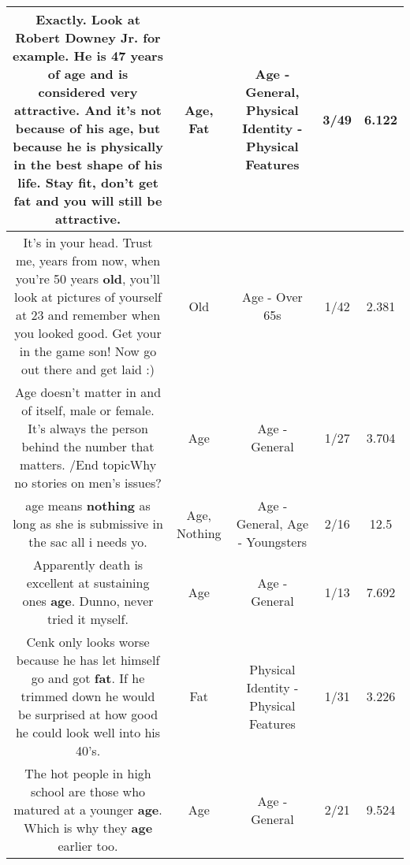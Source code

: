 \documentclass[11pt]{article}
\newlength\mylength
\begin{document}
\begin{center}
\begin{longtable}{|C{.65\mylength}|C{.30\mylength}|C{.12\mylength}|C{.12\mylength}|C{.12\mylength}|}
  \small Exactly. Look at Robert Downey Jr. for example. He is 47 years of \textbf{age} and is considered very attractive. And it's not because of his \textbf{age}, but because he is physically in the best shape of his life. Stay fit, don't get \textbf{fat} and you will still be attractive.\normalsize   & Age, Fat & Age - General, Physical Identity - Physical Features & 3/49 & 6.122 \\  \hline
  \small It's in your head. Trust me, years from now, when you're 50 years \textbf{old}, you'll look at pictures of yourself at 23 and remember when you looked good. Get your in the game son! Now go out there and get laid :)\normalsize   & Old & Age - Over 65s & 1/42 & 2.381 \\  \hline
  \small Age doesn't matter in and of itself, male or female. It's always the person behind the number that matters. /End topicWhy no stories on men's issues?\normalsize   & Age & Age - General & 1/27 & 3.704 \\  \hline
  \small age means \textbf{nothing} as long as she is submissive in the sac all i needs yo.\normalsize   & Age, Nothing & Age - General, Age - Youngsters & 2/16 & 12.5 \\  \hline
  \small Apparently death is excellent at sustaining ones \textbf{age}. Dunno, never tried it myself.\normalsize   & Age & Age - General & 1/13 & 7.692 \\  \hline
  \small Cenk only looks worse because he has let himself go and got \textbf{fat}. If he trimmed down he would be surprised at how good he could look well into his 40's.\normalsize   & Fat & Physical Identity - Physical Features & 1/31 & 3.226 \\  \hline
  \small The hot people in high school are those who matured at a younger \textbf{age}. Which is why they \textbf{age} earlier too.\normalsize   & Age & Age - General & 2/21 & 9.524 \\  \hline

\end{longtable}
\end{center}
\end{document}
